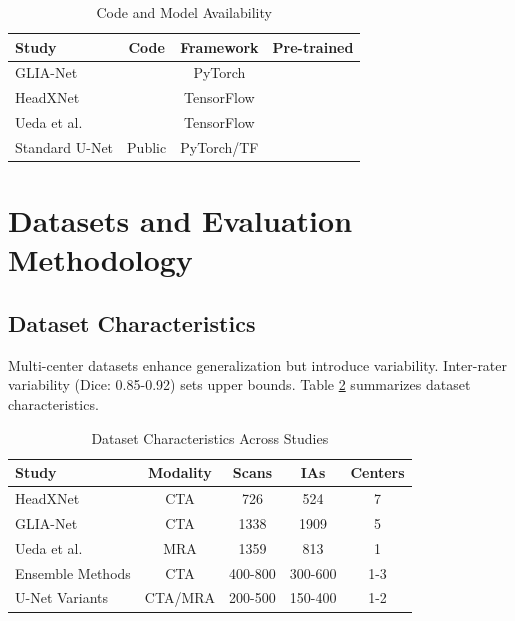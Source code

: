 \documentclass[conference]{IEEEtran}
\newcommand{\cmark}{\ding{51}}
\newcommand{\xmark}{\ding{55}}
\begin{document}
\begin{table}[htbp]
\caption{Code and Model Availability}
\begin{center}
\scriptsize
\begin{tabular}{|l|c|c|c|}
\hline
\textbf{Study} & \textbf{Code} & \textbf{Framework} & \textbf{Pre-trained} \\
\hline
GLIA-Net & \cmark & PyTorch & \xmark \\
\hline
HeadXNet & \xmark & TensorFlow & \xmark \\
\hline
Ueda et al. & \xmark & TensorFlow & \xmark \\
\hline
Standard U-Net & Public & PyTorch/TF & \cmark \\
\hline
\end{tabular}
\label{tab:code}
\end{center}
\end{table}

\section{Datasets and Evaluation Methodology}

\subsection{Dataset Characteristics}

Multi-center datasets enhance generalization but introduce variability. Inter-rater variability (Dice: 0.85-0.92) sets upper bounds. Table \ref{tab:datasets} summarizes dataset characteristics.

\begin{table}[htbp]
\caption{Dataset Characteristics Across Studies}
\begin{center}
\begin{tabular}{|l|c|c|c|c|}
\hline
\textbf{Study} & \textbf{Modality} & \textbf{Scans} & \textbf{IAs} & \textbf{Centers} \\
\hline
HeadXNet & CTA & 726 & 524 & 7 \\
\hline
GLIA-Net & CTA & 1338 & 1909 & 5 \\
\hline
Ueda et al. & MRA & 1359 & 813 & 1 \\
\hline
Ensemble Methods & CTA & 400-800 & 300-600 & 1-3 \\
\hline
U-Net Variants & CTA/MRA & 200-500 & 150-400 & 1-2 \\
\hline
\end{tabular}
\label{tab:datasets}
\end{center}
\end{table}
\end{document}

